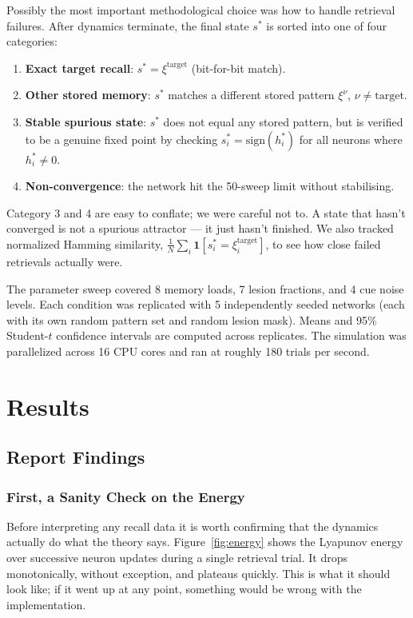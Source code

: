 \documentclass[11pt,a4paper]{article}
\begin{document}
Possibly the most important methodological choice was how to handle retrieval failures. After dynamics terminate, the final state $s^*$ is sorted into one of four categories:
\begin{enumerate}
    \item \textbf{Exact target recall}: $s^* = \xi^{\text{target}}$ (bit-for-bit match).
    \item \textbf{Other stored memory}: $s^*$ matches a different stored pattern $\xi^\nu$, $\nu \neq \text{target}$.
    \item \textbf{Stable spurious state}: $s^*$ does not equal any stored pattern, but is verified to be a genuine fixed point by checking $s_i^* = \text{sign}(h_i^*)$ for all neurons where $h_i^* \neq 0$.
    \item \textbf{Non-convergence}: the network hit the 50-sweep limit without stabilising.
\end{enumerate}
Category 3 and 4 are easy to conflate; we were careful not to. A state that hasn't converged is not a spurious attractor --- it just hasn't finished. We also tracked normalized Hamming similarity, $\frac{1}{N}\sum_i \mathbf{1}[s_i^* = \xi_i^{\text{target}}]$, to see how close failed retrievals actually were.

The parameter sweep covered 8 memory loads, 7 lesion fractions, and 4 cue noise levels. Each condition was replicated with 5 independently seeded networks (each with its own random pattern set and random lesion mask). Means and 95\% Student-$t$ confidence intervals are computed across replicates. The simulation was parallelized across 16 CPU cores and ran at roughly 180 trials per second.

\section{Results}

\subsection{Report Findings}

\subsubsection{First, a Sanity Check on the Energy}

Before interpreting any recall data it is worth confirming that the dynamics actually do what the theory says. Figure~\ref{fig:energy} shows the Lyapunov energy over successive neuron updates during a single retrieval trial. It drops monotonically, without exception, and plateaus quickly. This is what it should look like; if it went up at any point, something would be wrong with the implementation.
\end{document}
